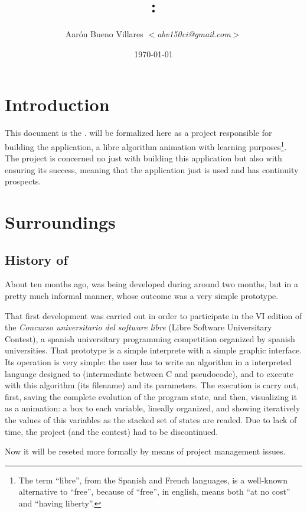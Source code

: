\documentclass[twocolumn]{article}
\title{\fav: \favc}
\author{Aarón Bueno Villares \textit{$<$abv150ci@gmail.com$>$}}
\date{\today}
\begin{document}
\twocolumn[
  \maketitle
]

\tableofcontents

\section{Introduction}
This document is the \favc. \favp will be formalized
here as a project responsible for building the \fav application, a
libre algorithm animation with learning purposes\footnote{The
  term ``libre'', from the Spanish and French languages, is a well-known
  alternative to ``free'', because of ``free'', in english, means both
  ``at no cost'' and ``having liberty''.}. The
project is concerned no just with building this
application but also with ensuring its success, meaning that the
application just is used and has continuity prospects.

\section{Surroundings}
\subsection{History of \fav}
About ten months ago, \fav was
being developed during around two months, but in a pretty much
informal manner, whose outcome was a very simple prototype.

That first \fav development was carried out in order to participate in the
VI edition of the \textit{Concurso universitario del software libre}
(Libre Software Universitary Contest), a spanish
universitary programming competition organized by spanish
universities. That prototype is a simple interprete with a simple
graphic interface. Its operation is very simple: the user has to write
an algorithm in a interpreted language designed to \fav (intermediate
between C and pseudocode), and to execute \fav with this algorithm
(its filename) and its parameters. The execution is carry out, first,
saving the complete evolution of the program state, and then,
visualizing it as a animation: a box to each variable, lineally
organized, and showing iteratively the values of this variables as the
stacked set of states are readed. Due to lack of time, the
project (and the contest) had to be discontinued.

Now it will be reseted more formally by means of project
management issues.
\end{document}
